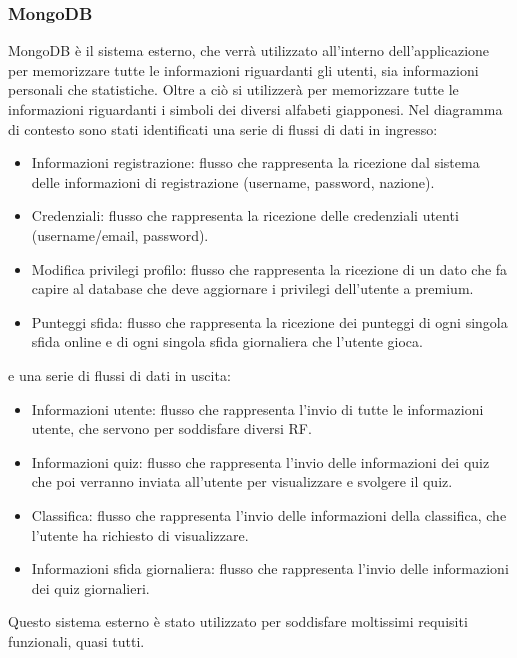 \subsubsection{MongoDB}
MongoDB è il sistema esterno, che verrà utilizzato all'interno dell'applicazione per memorizzare tutte le informazioni riguardanti gli utenti, sia informazioni personali che statistiche. Oltre a ciò si utilizzerà per memorizzare tutte le informazioni riguardanti i simboli dei diversi alfabeti giapponesi. Nel diagramma di contesto sono stati identificati una serie di flussi di dati in ingresso:
\begin{itemize}
    \item Informazioni registrazione: flusso che rappresenta la ricezione dal sistema delle informazioni di registrazione (username, password, nazione).
    \item Credenziali: flusso che rappresenta la ricezione delle credenziali utenti (username/email, password).
    \item Modifica privilegi profilo: flusso che rappresenta la ricezione di un dato che fa capire al database che deve aggiornare i privilegi dell'utente a premium.
    \item Punteggi sfida: flusso che rappresenta la ricezione dei punteggi di ogni singola sfida online e di ogni singola sfida giornaliera che l'utente gioca.
\end{itemize}
\noindent
e una serie di flussi di dati in uscita:
\begin{itemize}
    \item Informazioni utente: flusso che rappresenta l'invio di tutte le informazioni utente, che servono per soddisfare diversi RF.
    \item Informazioni quiz: flusso che rappresenta l'invio delle informazioni dei quiz che poi verranno inviata all'utente per visualizzare e svolgere il quiz.
    \item Classifica: flusso che rappresenta l'invio delle informazioni della classifica, che l'utente ha richiesto di visualizzare.
    \item Informazioni sfida giornaliera: flusso che rappresenta l'invio delle informazioni dei quiz giornalieri.
\end{itemize}
\noindent
Questo sistema esterno è stato utilizzato per soddisfare moltissimi requisiti funzionali, quasi tutti.